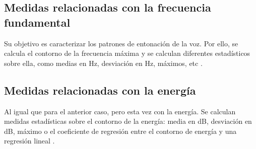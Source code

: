 \subsection{Medidas relacionadas con la frecuencia fundamental}
Su objetivo es caracterizar los patrones de entonación de la voz. Por ello, se calcula el contorno de la frecuencia máxima y se calculan diferentes estadísticos sobre ella, como medias en Hz, desviación en Hz, máximos, etc \cite{neurospeech}.

\subsection{Medidas relacionadas con la energía}
Al igual que para el anterior caso, pero esta vez con la energía. Se calculan medidas estadísticas sobre el contorno de la energía: media en dB, desviación en dB, máximo o el coeficiente de regresión entre el contorno de energía y una regresión lineal \cite{neurospeech}.
